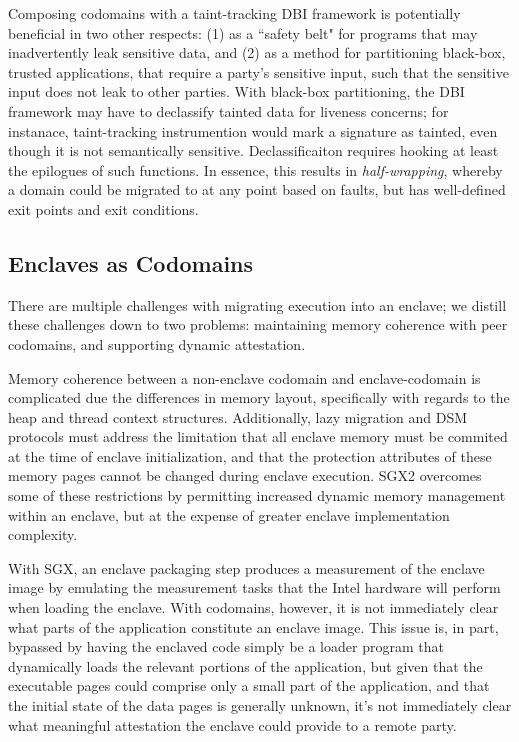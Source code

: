 Composing codomains with a taint-tracking DBI framework is potentially
beneficial in two other respects: (1) as a ``safety belt" for programs
that may inadvertently leak sensitive data, and (2) as a method for
partitioning black-box, trusted applications, that require a party's sensitive
input, such that the sensitive input does not leak to other parties.
%
With black-box partitioning, the DBI framework may have to declassify tainted
data for liveness concerns; for instanace, taint-tracking instrumention would
mark a signature as tainted, even though it is not semantically sensitive.
%
Declassificaiton requires hooking at least the epilogues of such functions.
%
In essence, this results in \emph{half-wrapping}, whereby a domain could be
migrated to at any point based on faults, but has well-defined exit points and
exit conditions.


\subsection{Enclaves as Codomains}
\label{sec:enclaves-as-codomains}

There are multiple challenges with migrating execution into an enclave; we
distill these challenges down to two problems: maintaining memory coherence
with peer codomains, and supporting dynamic attestation.


Memory coherence between a non-enclave codomain and enclave-codomain is
complicated due the differences in memory layout, specifically with regards to
the heap and thread context structures.
%
Additionally, lazy migration and DSM protocols must address the limitation that
all enclave memory must be commited at the time of enclave initialization, and
that the protection attributes of these memory pages cannot be changed during
enclave execution.
%
SGX2 overcomes some of these restrictions by permitting increased dynamic memory
management within an enclave, but at the expense of greater enclave
implementation complexity.
%

With SGX, an enclave packaging step produces a measurement of the enclave image by
emulating the measurement tasks that the Intel hardware will perform when
loading the enclave.
%
With codomains, however, it is not immediately clear what parts of the
application constitute an enclave image.
%
This issue is, in part, bypassed by having the enclaved code simply be a loader
program that dynamically loads the relevant portions of the application, but
given that the executable pages could comprise only a small part of the
application, and that the initial state of the data pages is generally unknown,
it's not immediately clear what meaningful attestation the enclave could
provide to a remote party.


